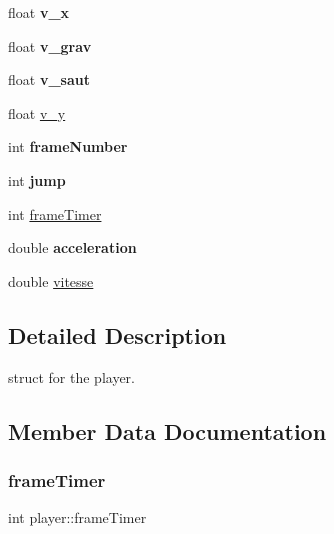\begin{DoxyCompactItemize}
\mbox{\label{structplayer_a2e7bc1765c84c50ddf779d8988bcf95c}} 
float {\bfseries v\+\_\+x}
\item 
\mbox{\label{structplayer_a185aff604f4d0cec6c4d7da562a5d88a}} 
float {\bfseries v\+\_\+grav}
\item 
\mbox{\label{structplayer_afc11f2ff6c936fd9fddcdb680b335a6f}} 
float {\bfseries v\+\_\+saut}
\item 
float \hyperlink{structplayer_a0b4769151ecb3fe4c2b30e6edf7a806b}{v\+\_\+y}
\item 
\mbox{\label{structplayer_ad400d2d5b54b04858b183b976eeb72af}} 
int {\bfseries frame\+Number}
\item 
\mbox{\label{structplayer_a67b27b024628915f4b80addab0c5597e}} 
int {\bfseries jump}
\item 
int \hyperlink{structplayer_aa5ef20332800ae3f6168f606b4e8278e}{frame\+Timer}
\item 
\mbox{\label{structplayer_a474dec8f4d9b46508e45286584237af5}} 
double {\bfseries acceleration}
\item 
double \hyperlink{structplayer_a824955d2f59f876154c6d1ce0de0b514}{vitesse}
\end{DoxyCompactItemize}


\subsection{Detailed Description}
struct for the player. 

\subsection{Member Data Documentation}
\mbox{\label{structplayer_aa5ef20332800ae3f6168f606b4e8278e}} 
\subsubsection{\texorpdfstring{frame\+Timer}{frameTimer}}
{\footnotesize\ttfamily int player\+::frame\+Timer}


